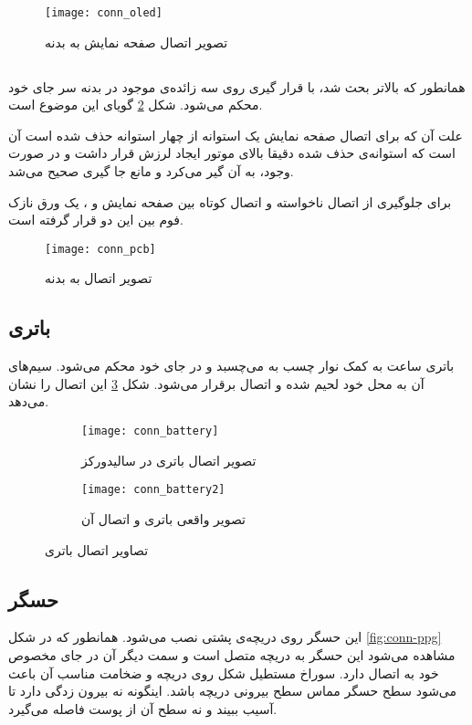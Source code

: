 	\begin{figure}[h]
		\centering
		\texttt{[image: conn\_oled]}
		\caption{تصویر اتصال صفحه نمایش به بدنه}
		\label{fig:conn-oled}
	\end{figure}

\subsection{\pcbf}
همانطور که بالاتر بحث شد، \pcbf با قرار گیری روی سه زائده‌ی موجود در بدنه سر جای خود محکم می‌شود. شکل \ref{fig:conn-pcb} گویای این موضوع است.

علت آن که برای اتصال صفحه نمایش یک استوانه از چهار استوانه حذف شده است آن است که استوانه‌ی حذف شده دقیقا بالای موتور ایجاد لرزش قرار داشت و در صورت وجود، به آن گیر می‌کرد و مانع جا گیری صحیح \pcbf می‌شد.

برای جلوگیری از اتصال ناخواسته و اتصال کوتاه بین صفحه نمایش و \pcbf، یک ورق نازک فوم بین این دو قرار گرفته است.

	\begin{figure}[h]
		\centering
		\texttt{[image: conn\_pcb]}
		\caption{تصویر اتصال \pcbf به بدنه}
		\label{fig:conn-pcb}
	\end{figure}

\subsection{باتری}
باتری ساعت به کمک نوار چسب به \pcbf می‌چسبد و در جای خود محکم می‌شود. سیم‌های آن به محل خود لحیم شده و اتصال برقرار می‌شود. شکل \ref{fig:conn-battery} این اتصال را نشان می‌دهد.

	\begin{figure}[h]
		\centering
		\begin{subfigure}{0.5\textwidth}
			\centering
			\texttt{[image: conn\_battery]}
			\caption{تصویر اتصال باتری در سالیدورکز}
		\end{subfigure} 
		\begin{subfigure}{0.4\textwidth}
			\centering
			\texttt{[image: conn\_battery2]}
			\caption{تصویر واقعی باتری و اتصال آن}
		\end{subfigure}
		\caption{تصاویر اتصال باتری}
		\label{fig:conn-battery}
	\end{figure}

\subsection{حسگر }
این حسگر روی دریچه‌ی پشتی نصب می‌شود. همانطور که در شکل \ref{fig:conn-ppg} مشاهده می‌شود این حسگر به دریچه متصل است و سمت دیگر آن در جای مخصوص خود به \pcbf اتصال دارد. سوراخ مستطیل شکل روی دریچه و ضخامت مناسب آن باعث می‌شود سطح حسگر مماس سطح بیرونی دریچه باشد. اینگونه نه بیرون زدگی دارد تا آسیب ببیند و نه سطح آن از پوست فاصله می‌گیرد.

